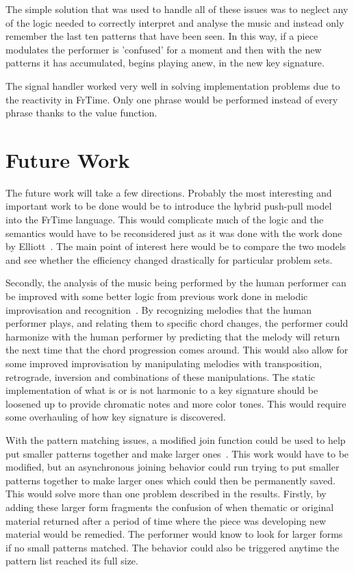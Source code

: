 \documentclass[12pt]{ucthesis}
\begin{document}
The simple solution that was used to handle all of these issues was to neglect any of the logic needed to correctly interpret and analyse the music and instead only remember the last ten patterns that have been seen. In this way, if a piece modulates the performer is 'confused' for a moment and then with the new patterns it has accumulated, begins playing anew, in the new key signature. 

The signal handler worked very well in solving implementation problems due to the reactivity in FrTime. Only one phrase would be performed instead of every phrase thanks to the value function.

\chapter{Future Work}
\label{future}

The future work will take a few directions. Probably the most interesting and important work to be done would be to introduce the hybrid push-pull model into the FrTime language. This would complicate much of the logic and the semantics would have to be reconsidered just as it was done with the work done by Elliott~\cite{push-pull-frp}. The main point of interest here would be to compare the two models and see whether the efficiency changed drastically for particular problem sets. 

Secondly, the analysis of the music being performed by the human performer can be improved with some better logic from previous work done in melodic improvisation and recognition~\cite{MelodicRecognition}. By recognizing melodies that the human performer plays, and relating them to specific chord changes, the performer could harmonize with the human performer by predicting that the melody will return the next time that the chord progression comes around. This would also allow for some improved improvisation by manipulating melodies with transposition, retrograde, inversion and combinations of these manipulations. The static implementation of what is or is not harmonic to a key signature should be loosened up to provide chromatic notes and more color tones. This would require some overhauling of how key signature is discovered. 

With the pattern matching issues, a modified join function could be used to help put smaller patterns together and make larger ones~\cite{slidingWindow}. This work would have to be modified, but an asynchronous joining behavior could run trying to put smaller patterns together to make larger ones which could then be permanently saved. This would solve more than one problem described in the results. Firstly, by adding these larger form fragments the confusion of when thematic or original material returned after a period of time where the piece was developing new material would be remedied. The performer would know to look for larger forms if no small patterns matched. The behavior could also be triggered anytime the pattern list reached its full size. 
\end{document}
